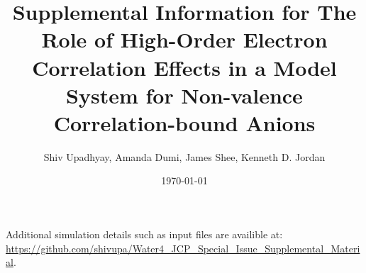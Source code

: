 \documentclass[12pt]{article}
\title{Supplemental Information for The Role of High-Order Electron Correlation Effects in a Model System for Non-valence Correlation-bound Anions}
\author{Shiv Upadhyay, Amanda Dumi, James Shee, Kenneth D. Jordan}
\date{\today}
\begin{document}
\maketitle
Additional simulation details such as input files are availible at: \url{https://github.com/shivupa/Water4_JCP_Special_Issue_Supplemental_Material}.
\tableofcontents
\newpage





%
%
\end{document}
